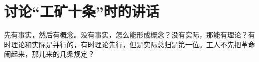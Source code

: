 \section[讨论“工矿十条”时的讲话（一九六六年十二月六日）]{讨论“工矿十条”时的讲话}


先有事实，然后有概念。没有事实，怎么能形成概念？没有实际，那能有理论？有时理论和实际是并行的，有时理论先行，但是实际总归是第一位。工人不先把革命闹起来，那儿来的几条规定？

